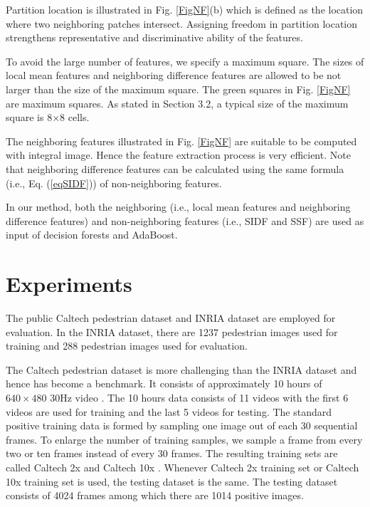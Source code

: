\documentclass[10pt,twocolumn,letterpaper]{article}
\begin{document}
Partition location is illustrated in Fig. \ref{FigNF}(b) which is defined as the 
location where two neighboring patches intersect. Assigning freedom in 
partition location strengthens representative and discriminative ability of 
the features. 

To avoid the large number of features, we specify a maximum square. 
The sizes of local mean features and neighboring difference features are 
allowed to be not larger than the size of the maximum square. The green squares in 
Fig. \ref{FigNF} are maximum squares. As stated in Section 3.2, a typical size of 
the maximum square is 8$\times $8 cells. 

The neighboring features illustrated in Fig. \ref{FigNF} are suitable to be computed 
with integral image. Hence the feature extraction process is very efficient. 
Note that neighboring difference features can be calculated using the same 
formula (i.e., Eq. (\ref{eqSIDF})) of non-neighboring features.

In our method, both the neighboring (i.e., local mean features and 
neighboring difference features) and non-neighboring features (i.e., SIDF and SSF) are used as input of decision forests and AdaBoost.

\section{Experiments}
The public Caltech pedestrian dataset \cite{Caltech,Dollar_PD_PAMI_2012} and 
INRIA dataset \cite{Dalal_HOG_CVPR_2005} are employed for evaluation. In 
the INRIA dataset, there are 1237 pedestrian images used for training and 
288 pedestrian images used for evaluation.

The Caltech pedestrian dataset is more challenging than the INRIA dataset 
and hence has become a benchmark. It consists of approximately 10 hours of 
$640\times 480$ 30Hz video \cite{Caltech}. The 10 hours data consists of 11 
videos with the first 6 videos are used for training and the last 5 videos 
for testing. The standard 
positive training data is formed by sampling one image out of each 30 
sequential frames. To enlarge the number of training samples, we sample a frame from every two 
or ten frames instead of every 30 frames. The resulting 
training sets are called Caltech 2x and Caltech 10x \cite{Zhang_FCF_CVPR_2015}. Whenever Caltech 2x training set or Caltech 10x training set is used, the testing dataset is the same. The testing dataset consists of 4024 frames among which there are 1014 positive images. 
\end{document}
